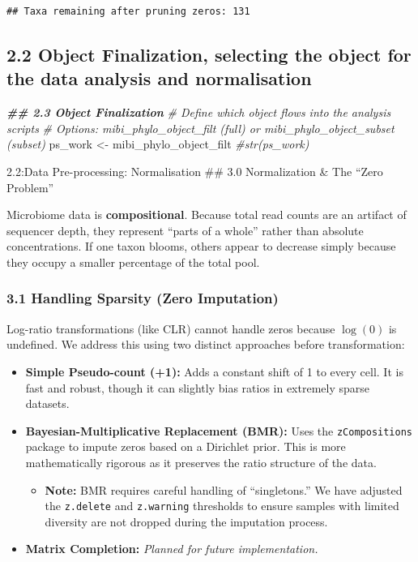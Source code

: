 \documentclass[
]{article}
\newenvironment{Shaded}{\begin{snugshade}}{\end{snugshade}}
\newcommand{\CommentTok}[1]{\textcolor[rgb]{0.56,0.35,0.01}{\textit{#1}}}
\newcommand{\DocumentationTok}[1]{\textcolor[rgb]{0.56,0.35,0.01}{\textbf{\textit{#1}}}}
\newcommand{\NormalTok}[1]{#1}
\newcommand{\OtherTok}[1]{\textcolor[rgb]{0.56,0.35,0.01}{#1}}
\providecommand{\tightlist}{%
  \setlength{\itemsep}{0pt}\setlength{\parskip}{0pt}}
\begin{document}
\begin{verbatim}
## Taxa remaining after pruning zeros: 131
\end{verbatim}

\subsection{2.2 Object Finalization, selecting the object for the data
analysis and
normalisation}\label{object-finalization-selecting-the-object-for-the-data-analysis-and-normalisation}

\begin{Shaded}
\begin{Highlighting}[]
\DocumentationTok{\#\# 2.3 Object Finalization}
\CommentTok{\# Define which object flows into the analysis scripts}
\CommentTok{\# Options: mibi\_phylo\_object\_filt (full) or mibi\_phylo\_object\_subset (subset)}
\NormalTok{ps\_work }\OtherTok{\textless{}{-}}\NormalTok{ mibi\_phylo\_object\_filt}
\CommentTok{\#str(ps\_work)}
\end{Highlighting}
\end{Shaded}

2.2:Data Pre-processing: Normalisation \#\# 3.0 Normalization \& The
``Zero Problem''

Microbiome data is \textbf{compositional}. Because total read counts are
an artifact of sequencer depth, they represent ``parts of a whole''
rather than absolute concentrations. If one taxon blooms, others appear
to decrease simply because they occupy a smaller percentage of the total
pool.

\subsubsection{3.1 Handling Sparsity (Zero
Imputation)}\label{handling-sparsity-zero-imputation}

Log-ratio transformations (like CLR) cannot handle zeros because
\(\log(0)\) is undefined. We address this using two distinct approaches
before transformation:

\begin{itemize}
\tightlist
\item
  \textbf{Simple Pseudo-count (+1):} Adds a constant shift of 1 to every
  cell. It is fast and robust, though it can slightly bias ratios in
  extremely sparse datasets.
\item
  \textbf{Bayesian-Multiplicative Replacement (BMR):} Uses the
  \texttt{zCompositions} package to impute zeros based on a Dirichlet
  prior. This is more mathematically rigorous as it preserves the ratio
  structure of the data.

  \begin{itemize}
  \tightlist
  \item
    \textbf{Note:} BMR requires careful handling of ``singletons.'' We
    have adjusted the \texttt{z.delete} and \texttt{z.warning}
    thresholds to ensure samples with limited diversity are not dropped
    during the imputation process.
  \end{itemize}
\item
  \textbf{Matrix Completion:} \emph{Planned for future implementation.}
\end{itemize}
\end{document}
